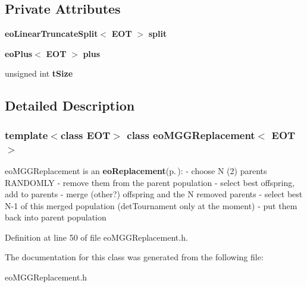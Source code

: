 \subsection*{Private Attributes}
\begin{CompactItemize}
\item 
{\bf eo\-Linear\-Truncate\-Split}$<$ {\bf EOT} $>$ {\bf split}\label{classeo_m_g_g_replacement_r0}

\item 
{\bf eo\-Plus}$<$ {\bf EOT} $>$ {\bf plus}\label{classeo_m_g_g_replacement_r1}

\item 
unsigned int {\bf t\-Size}\label{classeo_m_g_g_replacement_r2}

\end{CompactItemize}


\subsection{Detailed Description}
\subsubsection*{template$<$class EOT$>$ class eo\-MGGReplacement$<$ EOT $>$}

eo\-MGGReplacement is an {\bf eo\-Replacement}{\rm (p.\,\pageref{classeo_replacement})}: - choose N (2) parents RANDOMLY - remove them from the parent population - select best offspring, add to parents - merge (other?) offspring and the N removed parents - select best N-1 of this merged population (det\-Tournament only at the moment) - put them back into parent population 



Definition at line 50 of file eo\-MGGReplacement.h.

The documentation for this class was generated from the following file:\begin{CompactItemize}
\item 
eo\-MGGReplacement.h\end{CompactItemize}
